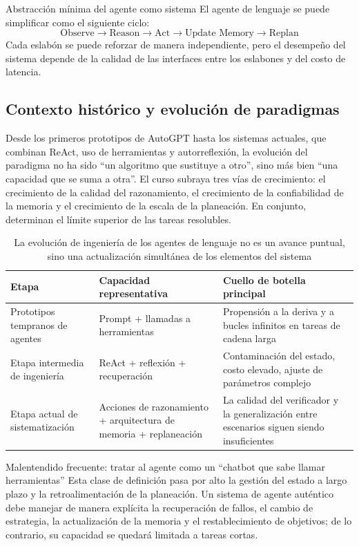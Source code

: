 \documentclass[a4paper]{article}
\begin{document}
\begin{knowledgebox}{Abstracción mínima del agente como sistema}
El agente de lenguaje se puede simplificar como el siguiente ciclo:
\[
\text{Observe} \rightarrow \text{Reason} \rightarrow \text{Act} \rightarrow \text{Update Memory} \rightarrow \text{Replan}
\]
Cada eslabón se puede reforzar de manera independiente, pero el desempeño del sistema depende de la calidad de las interfaces entre los eslabones y del costo de latencia.
\end{knowledgebox}

\subsection{Contexto histórico y evolución de paradigmas}

Desde los primeros prototipos de AutoGPT hasta los sistemas actuales, que combinan ReAct, uso de herramientas y autorreflexión, la evolución del paradigma no ha sido ``un algoritmo que sustituye a otro'', sino más bien ``una capacidad que se suma a otra''. El curso subraya tres vías de crecimiento: el crecimiento de la calidad del razonamiento, el crecimiento de la confiabilidad de la memoria y el crecimiento de la escala de la planeación. En conjunto, determinan el límite superior de las tareas resolubles.

\begin{table}[H]
\centering
\begin{tabular}{p{2.5cm}p{4.2cm}p{4.7cm}}
\toprule
\textbf{Etapa} & \textbf{Capacidad representativa} & \textbf{Cuello de botella principal} \\
\midrule
Prototipos tempranos de agentes & Prompt + llamadas a herramientas & Propensión a la deriva y a bucles infinitos en tareas de cadena larga \\
Etapa intermedia de ingeniería & ReAct + reflexión + recuperación & Contaminación del estado, costo elevado, ajuste de parámetros complejo \\
Etapa actual de sistematización & Acciones de razonamiento + arquitectura de memoria + replaneación & La calidad del verificador y la generalización entre escenarios siguen siendo insuficientes \\
\bottomrule
\end{tabular}
\caption{La evolución de ingeniería de los agentes de lenguaje no es un avance puntual, sino una actualización simultánea de los elementos del sistema}
\end{table}

\begin{warningbox}{Malentendido frecuente: tratar al agente como un ``chatbot que sabe llamar herramientas''}
Esta clase de definición pasa por alto la gestión del estado a largo plazo y la retroalimentación de la planeación. Un sistema de agente auténtico debe manejar de manera explícita la recuperación de fallos, el cambio de estrategia, la actualización de la memoria y el restablecimiento de objetivos; de lo contrario, su capacidad se quedará limitada a tareas cortas.
\end{warningbox}
\end{document}
